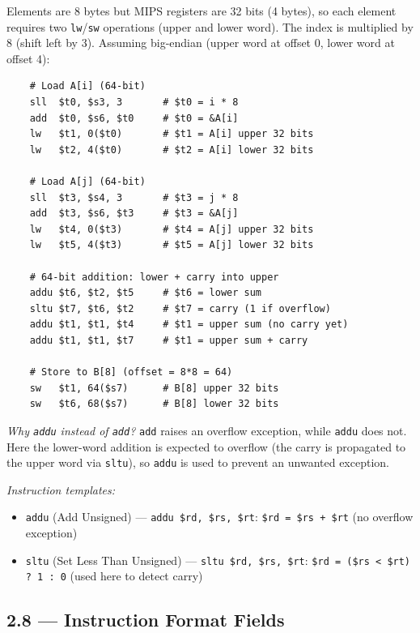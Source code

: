 Elements are 8 bytes but MIPS registers are 32 bits (4 bytes), so each
element requires two \texttt{lw}/\texttt{sw} operations (upper and lower
word). The index is multiplied by 8 (shift left by 3). Assuming big-endian
(upper word at offset 0, lower word at offset 4):
\begin{verbatim}
    # Load A[i] (64-bit)
    sll  $t0, $s3, 3       # $t0 = i * 8
    add  $t0, $s6, $t0     # $t0 = &A[i]
    lw   $t1, 0($t0)       # $t1 = A[i] upper 32 bits
    lw   $t2, 4($t0)       # $t2 = A[i] lower 32 bits

    # Load A[j] (64-bit)
    sll  $t3, $s4, 3       # $t3 = j * 8
    add  $t3, $s6, $t3     # $t3 = &A[j]
    lw   $t4, 0($t3)       # $t4 = A[j] upper 32 bits
    lw   $t5, 4($t3)       # $t5 = A[j] lower 32 bits

    # 64-bit addition: lower + carry into upper
    addu $t6, $t2, $t5     # $t6 = lower sum
    sltu $t7, $t6, $t2     # $t7 = carry (1 if overflow)
    addu $t1, $t1, $t4     # $t1 = upper sum (no carry yet)
    addu $t1, $t1, $t7     # $t1 = upper sum + carry

    # Store to B[8] (offset = 8*8 = 64)
    sw   $t1, 64($s7)      # B[8] upper 32 bits
    sw   $t6, 68($s7)      # B[8] lower 32 bits
\end{verbatim}
\textit{Why \texttt{addu} instead of \texttt{add}?}\enspace
\texttt{add} raises an overflow exception, while \texttt{addu} does not.
Here the lower-word addition is expected to overflow (the carry is
propagated to the upper word via \texttt{sltu}), so \texttt{addu} is used
to prevent an unwanted exception.

\medskip\noindent\textit{Instruction templates:}
\begin{itemize}
  \item \texttt{addu} (Add Unsigned) --- \texttt{addu \$rd, \$rs, \$rt}:
        \texttt{\$rd = \$rs + \$rt} (no overflow exception)
  \item \texttt{sltu} (Set Less Than Unsigned) --- \texttt{sltu \$rd, \$rs, \$rt}:
        \texttt{\$rd = (\$rs < \$rt) ? 1 : 0} (used here to detect carry)
\end{itemize}

\subsection*{2.8 --- Instruction Format Fields}
\hypertarget{sol-2.8}{}

